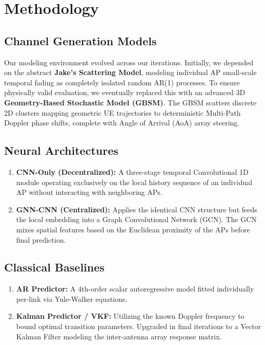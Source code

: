 \documentclass[12pt,a4paper]{article}
\begin{document}
\section{Methodology}
\subsection{Channel Generation Models}
Our modeling environment evolved across our iterations. Initially, we depended on the abstract \textbf{Jake's Scattering Model}, modeling individual AP small-scale temporal fading as completely isolated random AR(1) processes.
To ensure physically valid evaluation, we eventually replaced this with an advanced 3D \textbf{Geometry-Based Stochastic Model (GBSM)}. The GBSM scatters discrete 2D clusters mapping geometric UE trajectories to deterministic Multi-Path Doppler phase shifts, complete with Angle of Arrival (AoA) array steering.

\subsection{Neural Architectures}
\begin{enumerate}[label=(\alph*)]
    \item \textbf{CNN-Only (Decentralized):} A three-stage temporal Convolutional 1D module operating exclusively on the local history sequence of an individual AP without interacting with neighboring APs.
    \item \textbf{GNN-CNN (Centralized):} Applies the identical CNN structure but feeds the local embedding into a Graph Convolutional Network (GCN). The GCN mixes spatial features based on the Euclidean proximity of the APs before final prediction.
\end{enumerate}

\subsection{Classical Baselines}
\begin{enumerate}[label=(\alph*)]
    \item \textbf{AR Predictor:} A 4th-order scalar autoregressive model fitted individually per-link via Yule-Walker equations.
    \item \textbf{Kalman Predictor / VKF:} Utilizing the known Doppler frequency to bound optimal transition parameters. Upgraded in final iterations to a Vector Kalman Filter modeling the inter-antenna array response matrix.
\end{enumerate}
\end{document}
